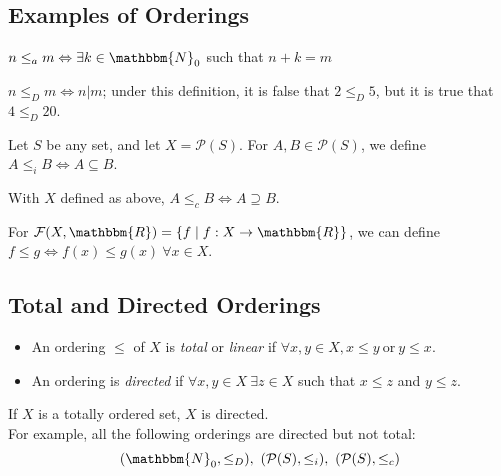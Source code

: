 \documentclass[10pt]{extarticle}
\newcommand{\N}{\mathbbm{N}}
\newcommand{\R}{\mathbbm{R}}
\begin{document}
    \subsection{Examples of Orderings}%
    \begin{description}[font=\normalfont]
      \item[Algebraic Ordering of $\N_0$:] $n\leq_a m\Leftrightarrow \exists k\in \N_0$ such that $n+k = m$
      \item[$\N$ ordered via division:] $n\leq_D m \Leftrightarrow n|m$; under this definition, it is false that $2\leq_D 5$, but it is true that $4\leq_D 20$.
      \item[Inclusion:] Let $S$ be any set, and let $X = \mathcal{P}(S)$. For $A,B\in \mathcal{P}(S)$, we define $A\leq_i B \Leftrightarrow A\subseteq B$.
      \item[Containment:] With $X$ defined as above, $A\leq_c B\Leftrightarrow A\supseteq B$.
      \item[Functions:] For $\mathcal{F}(X,\R) = \{f\mid f:X\rightarrow\R\}$, we can define $f\leq g\Leftrightarrow f(x)\leq g(x)~\forall x\in X$.
    \end{description}
    \subsection{Total and Directed Orderings}%
      \begin{itemize}
        \item An ordering $\leq$ of $X$ is \textsl{total} or \textit{linear} if $\forall x,y\in X, x\leq y~\text{or}~y\leq x$. 
        \item An ordering is \textsl{directed} if $\forall x,y\in X~\exists z\in X$ such that $x\leq z$ and $y\leq z$.
      \end{itemize}
      If $X$ is a totally ordered set, $X$ is directed.\\

      For example, all the following orderings are directed but not total:
      \[
        (\N_0,\leq_D),~(\mathcal{P}(S),\leq_i),~(\mathcal{P}(S),\leq_c)
      \] 
\end{document}
